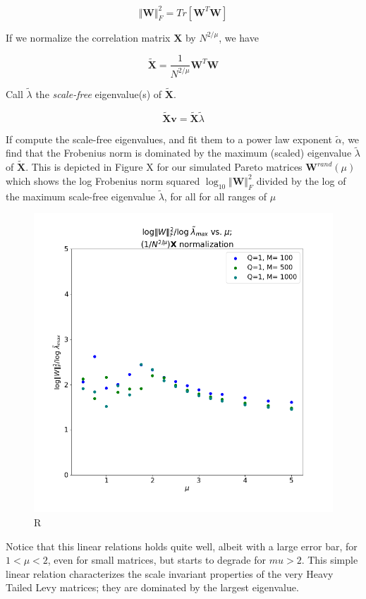 $$\Vert\mathbf{W}\Vert_{F}^{2}=Tr[\mathbf{W}^{T}\mathbf{W}]$$

If we normalize the correlation matrix $\mathbf{X}$ by $N^{2/\mu}$, we have

$$\tilde{\mathbf{X}}=\dfrac{1}{N^{2/\mu}}\mathbf{W}^{T}\mathbf{W}$$

Call $\tilde{\lambda}$ the \emph{scale-free} eigenvalue(s) of $\tilde{\mathbf{X}}$.

$$\tilde{\mathbf{X}}\mathbf{v}=\tilde{\mathbf{X}}\tilde{\lambda}$$

If compute the scale-free eigenvalues, and fit them to a power law exponent $\tilde{\alpha}$, we find that the Frobenius norm 
is dominated by the maximum (scaled) eigenvalue $\tilde{\lambda}$ of $\tilde{\mathbf{X}}$.  This is depicted in Figure X for our simulated
 Pareto matrices  $\mathbf{W}^{rand}(\mu)$ which shows
the log Frobenius norm squared $\log_{10}\Vert\mathbf{W}\Vert^{2}_{F}$ divided by the log of the maximum scale-free eigenvalue $\tilde{\lambda}$,
for all for all ranges of $\mu$

\begin{figure}[!htb]
 \centering
   \includegraphics[scale=0.40]{img/LogNorm-Lmax-Scaled.png}
   \caption{R }
  \label{fig:logNormHat}
\end{figure}

Notice that this linear relations holds quite well, albeit with a large error bar, for $1<\mu<2$, even for small matrices, but starts to degrade for $mu>2$.
This simple linear relation characterizes the scale invariant properties of the very Heavy Tailed Levy matrices; they are dominated by the largest eigenvalue.

